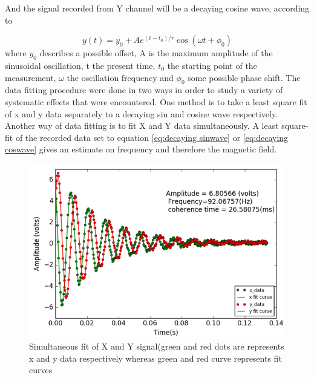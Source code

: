 And the signal recorded  from Y channel will be a decaying cosine wave, according to
                                       
  \begin{equation}
 y(t) = y_0 + A   e^{(t-t_0)/\tau}\cos(\omega t + \phi_0)\label{eq:decaying coswave}
\end{equation}
where $y_0$ describes a possible offset, A is the maximum amplitude of the sinusoidal oscillation,
t the present time, $t_0$ the starting point of the measurement, $\omega$ the oscillation frequency and $\phi_0$  some possible phase shift. The data fitting procedure were done in two ways in order to study a variety of systematic effects that were encountered. One method is to take a least square fit of x and y data separately to a decaying sin and cosine wave respectively. Another way of data fitting is to fit X and Y data simultaneously. A least square-fit of the recorded data set to equation \ref{eq:decaying sinwave} or \ref{eq:decaying coswave} gives an estimate on frequency and  therefore the magnetic field.
\begin{figure}[h]
\centering\includegraphics[width=0.55\linewidth]{figures/fid_simultaneous}
\caption{ Simultaneous fit of X and Y signal(green and red dots are represents x and y data respectively whereas green and red curve represents fit curves\label{Fig:FID fit}}
\end{figure}
  

